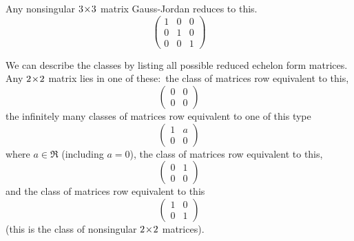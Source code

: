 \begin{example}
Any nonsingular \( 3 \! \times \! 3 \) matrix Gauss-Jordan reduces to this.
\begin{equation*}
    \begin{pmatrix}
      1  &0  &0 \\
      0  &1  &0 \\
      0  &0  &1
    \end{pmatrix}
\end{equation*}
\end{example}

\begin{example} \label{ex:RowEqClassTwoTwoMats}
We can describe the classes by listing all possible
reduced echelon form matrices.
Any $2 \! \times \! 2$ matrix lies in one of these:~the class of matrices
row equivalent to this,
\begin{equation*}
  \begin{pmatrix}
     0  &0  \\
     0  &0
  \end{pmatrix}
\end{equation*}
the infinitely many classes of matrices row equivalent to one of this type
\begin{equation*}
  \begin{pmatrix}
     1  &a  \\
     0  &0
  \end{pmatrix}
\end{equation*}
where \( a\in\Re \) (including $a=0$),
the class of matrices row equivalent to this,
\begin{equation*}
  \begin{pmatrix}
     0  &1  \\
     0  &0
  \end{pmatrix}
\end{equation*}
and the class of matrices row equivalent to this
\begin{equation*}
  \begin{pmatrix}
     1  &0  \\
     0  &1
  \end{pmatrix}
\end{equation*}
(this is the class of nonsingular $2 \! \times \! 2$ matrices).
\end{example}



